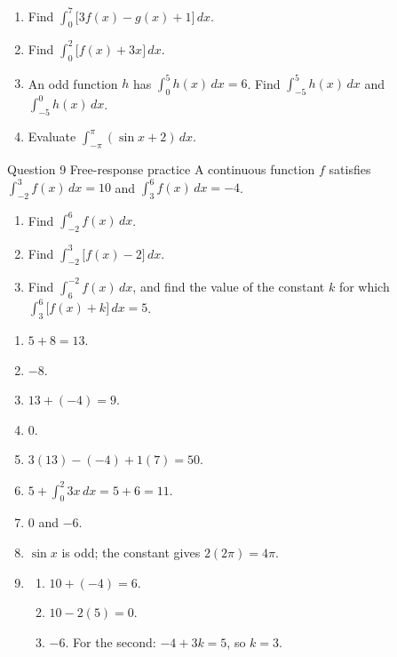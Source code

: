 \documentclass[11pt]{article}
\begin{document}
\begin{enumerate}[leftmargin=*,itemsep=2pt,start=5]
  \item Find $\displaystyle\int_{0}^{7}\big[3f(x)-g(x)+1\big]\,dx$.\work{2.8cm}
  \item Find $\displaystyle\int_{0}^{2}\big[f(x)+3x\big]\,dx$.\work{2.8cm}
  \item An odd function $h$ has $\displaystyle\int_{0}^{5}h(x)\,dx=6$. Find $\displaystyle\int_{-5}^{5}h(x)\,dx$ and $\displaystyle\int_{-5}^{0}h(x)\,dx$.\work{2.8cm}
  \item Evaluate $\displaystyle\int_{-\pi}^{\pi}(\sin x+2)\,dx$.\work{2.8cm}
\end{enumerate}

\begin{frbox}{Question 9 \textperiodcentered{} Free-response practice}
A continuous function $f$ satisfies $\displaystyle\int_{-2}^{3}f(x)\,dx=10$ and $\displaystyle\int_{3}^{6}f(x)\,dx=-4$.
\begin{enumerate}[label=(\alph*),leftmargin=*,itemsep=2pt]
  \item Find $\displaystyle\int_{-2}^{6}f(x)\,dx$.\work{2.6cm}
  \item Find $\displaystyle\int_{-2}^{3}\big[f(x)-2\big]\,dx$.\work{2.6cm}
  \item Find $\displaystyle\int_{6}^{-2}f(x)\,dx$, and find the value of the constant $k$ for which $\displaystyle\int_{3}^{6}\big[f(x)+k\big]\,dx=5$.\work{2.6cm}
\end{enumerate}
\end{frbox}

\newpage
\begin{solbox}
\begin{enumerate}[leftmargin=*,itemsep=4pt]
  \item $5+8=13$.
  \item $-8$.
  \item $13+(-4)=9$.
  \item $0$.
  \item $3(13)-(-4)+1(7)=50$.
  \item $5+\displaystyle\int_{0}^{2}3x\,dx=5+6=11$.
  \item $0$ and $-6$.
  \item $\sin x$ is odd; the constant gives $2(2\pi)=4\pi$.
  \item \begin{enumerate}[label=(\alph*),leftmargin=*,itemsep=3pt]
    \item $10+(-4)=6$.
    \item $10-2(5)=0$.
    \item $-6$. For the second: $-4+3k=5$, so $k=3$.
  \end{enumerate}
\end{enumerate}
\end{solbox}
\end{document}
